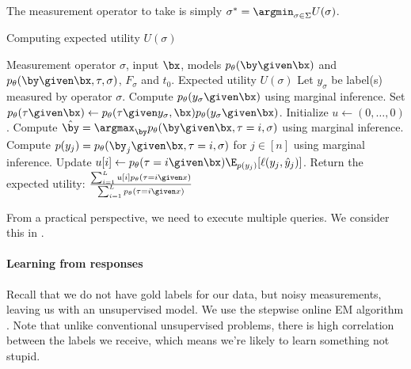 The measurement operator to take is simply $\sigma^* = \argmin_{\sigma \in \Sigma} U(\sigma)$.

\begin{algorithm}
\renewcommand{\algorithmicrequire}{\textbf{Input:}}
\renewcommand{\algorithmicensure}{\textbf{Output:}}
  \caption{Computing expected utility $U(\sigma)$}
  \label{algo:expected-utility}
  \begin{algorithmic}[1]
    \REQUIRE Measurement operator $\sigma$, input $\bx$, models $p_\theta(\by \given \bx)$ and $p_\theta(\by \given \bx, \tau, \sigma)$, $F_\sigma$ and $t_0$.
    \ENSURE Expected utility $U(\sigma)$
    \STATE Let $y_\sigma$ be label(s) measured by operator $\sigma$.
    \STATE Compute $p_\theta(y_\sigma \given \bx)$ using marginal inference.
    \STATE Set $p_\theta(\tau \given \bx) \gets p_\theta(\tau \given y_\sigma, \bx) p_\theta(y_\sigma \given \bx)$.
    \STATE Initialize $u \gets (0, \dots, 0)$.
    \STATE Compute $\byt = \argmax_{\by} p_\theta(\by \given \bx, \tau = i, \sigma)$ using marginal inference.
    \STATE Compute $p(y_j) = p_\theta(\by_j \given \bx, \tau = i, \sigma)$ for $j \in [n]$ using marginal inference.
    \STATE Update $u[i] \gets \p(\tau = i \given \bx) \E_{p(y_j)}[\ell(y_j, \yt_j)]$.
    \ENDFOR
    \STATE Return the expected utility: $\frac{\sum_{i=1}^L u[i] p_\theta(\tau = i \given x)}{\sum_{i=1}^L p_\theta(\tau = i \given x)}$
  \end{algorithmic}
\end{algorithm}

From a practical perspective, we need to execute multiple queries. We consider this in .

\paragraph{Learning from responses}

Recall that we do not have gold labels for our data, but noisy measurements, leaving us with an unsupervised model.
We use the stepwise online EM algorithm \cite{liang09online}.
Note that unlike conventional unsupervised problems, there is high correlation between the labels we receive, which means we're likely to learn something not stupid.

